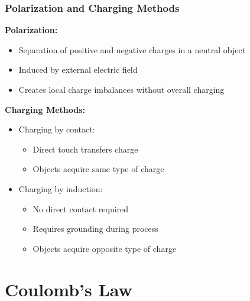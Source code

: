 \documentclass{beamer}
\newcommand{\highlight}[1]{\textcolor{ds9red}{#1}}
\begin{document}
\begin{frame}
    \frametitle{Polarization and Charging Methods}
    
    \textbf{Polarization:}
    \begin{itemize}
        \item Separation of positive and negative charges in a neutral object
        \item Induced by external electric field
        \item Creates local charge imbalances without overall charging
    \end{itemize}
    
    \vspace{0.5em}
    \textbf{Charging Methods:}
    \begin{itemize}
        \item \highlight{Charging by contact:} 
            \begin{itemize}
                \item Direct touch transfers charge
                \item Objects acquire same type of charge
            \end{itemize}
        \item \highlight{Charging by induction:}
            \begin{itemize}
                \item No direct contact required
                \item Requires grounding during process
                \item Objects acquire opposite type of charge
            \end{itemize}
    \end{itemize}
\end{frame}

\section{Coulomb's Law}
\end{document}
